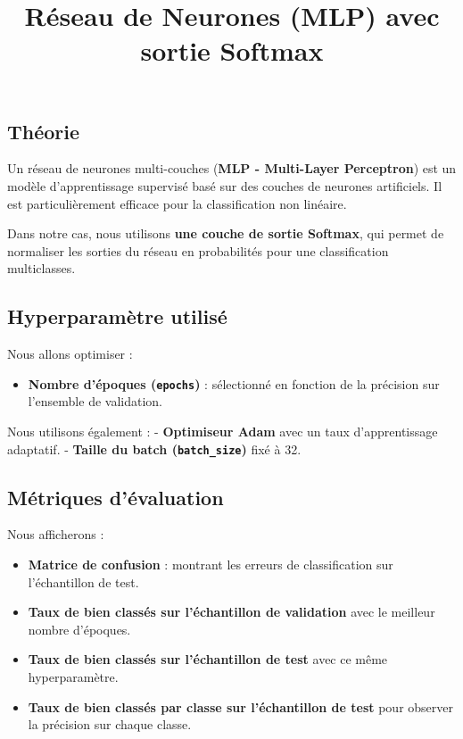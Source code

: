 \documentclass[
]{article}
\title{Réseau de Neurones (MLP) avec sortie Softmax}
\author{}
\date{}
\providecommand{\tightlist}{%
  \setlength{\itemsep}{0pt}\setlength{\parskip}{0pt}}\usepackage{longtable,booktabs,array}
\begin{document}
\maketitle


\subsection{Théorie}\label{thuxe9orie}

Un réseau de neurones multi-couches (\textbf{MLP - Multi-Layer
Perceptron}) est un modèle d'apprentissage supervisé basé sur des
couches de neurones artificiels. Il est particulièrement efficace pour
la classification non linéaire.

Dans notre cas, nous utilisons \textbf{une couche de sortie Softmax},
qui permet de normaliser les sorties du réseau en probabilités pour une
classification multiclasses.

\subsection{Hyperparamètre utilisé}\label{hyperparamuxe8tre-utilisuxe9}

Nous allons optimiser :

\begin{itemize}
\tightlist
\item
  \textbf{Nombre d'époques (\texttt{epochs})} : sélectionné en fonction
  de la précision sur l'ensemble de validation.
\end{itemize}

Nous utilisons également : - \textbf{Optimiseur Adam} avec un taux
d'apprentissage adaptatif. - \textbf{Taille du batch
(\texttt{batch\_size})} fixé à 32.

\subsection{Métriques d'évaluation}\label{muxe9triques-duxe9valuation}

Nous afficherons :

\begin{itemize}
\item
  \textbf{Matrice de confusion} : montrant les erreurs de classification
  sur l'échantillon de test.
\item
  \textbf{Taux de bien classés sur l'échantillon de validation} avec le
  meilleur nombre d'époques.
\item
  \textbf{Taux de bien classés sur l'échantillon de test} avec ce même
  hyperparamètre.
\item
  \textbf{Taux de bien classés par classe sur l'échantillon de test}
  pour observer la précision sur chaque classe.
\end{itemize}
\end{document}
